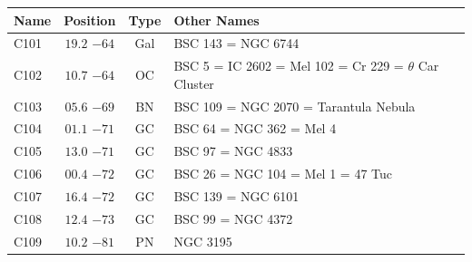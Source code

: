\begin{table}[t]
    \setlength{\tabcolsep}{2pt}
    \footnotesize
    \begin{tabularx}{\linewidth}{lccX}
        \hline
        Name&Position&Type&Other Names\\
        \hline

C101 &$19.2$ $-64$&Gal&BSC 143 = NGC 6744\\
C102 &$10.7$ $-64$&OC &BSC 5 = IC 2602 = Mel 102 = Cr 229 = $\theta$ Car Cluster\\
C103 &$05.6$ $-69$&BN &BSC 109 = NGC 2070 = Tarantula Nebula\\
C104 &$01.1$ $-71$&GC &BSC 64 = NGC 362 = Mel 4\\
C105 &$13.0$ $-71$&GC &BSC 97 = NGC 4833\\
C106 &$00.4$ $-72$&GC &BSC 26 = NGC 104 = Mel 1 = 47 Tuc\\
C107 &$16.4$ $-72$&GC &BSC 139 = NGC 6101\\
C108 &$12.4$ $-73$&GC &BSC 99 = NGC 4372\\
C109 &$10.2$ $-81$&PN &NGC 3195\\

        \hline
    \end{tabularx}
\end{table}
\clearpage


